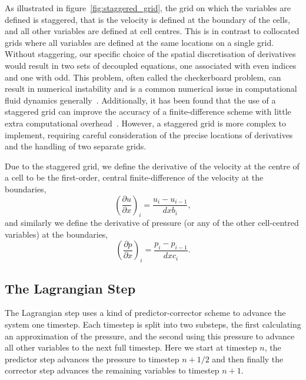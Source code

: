 As illustrated in figure~\ref{fig:staggered_grid}, the grid on which the variables are defined is staggered, that is the velocity is defined at the boundary of the cells, and all other variables are defined at cell centres. This is in contrast to collocated grids where all variables are defined at the same locations on a single grid. Without staggering, our specific choice of the spatial discretisation of derivatives would result in two sets of decoupled equations, one associated with even indices and one with odd. This problem, often called the checkerboard problem, can result in numerical instability and is a common numerical issue in computational fluid dynamics generally~\cite{ferzigerComputationalMethodsFluid2002}. Additionally, it has been found that the use of a staggered grid can improve the accuracy of a finite-difference scheme with little extra computational overhead~\cite{rojanaratanangkulePerformanceHighOrder2015}. However, a staggered grid is more complex to implement, requiring careful consideration of the precise locations of derivatives and the handling of two separate grids. 

Due to the staggered grid, we define the derivative of the velocity at the centre of a cell to be the first-order, central finite-difference of the velocity at the boundaries,
\begin{equation}
  {\left( \frac{\partial u}{\partial x} \right)}_i = \frac{u_i - u_{i-1}}{dxb_i},
  \label{}
\end{equation}
and similarly we define the derivative of pressure (or any of the other cell-centred variables) at the boundaries,
\begin{equation}
  {\left( \frac{\partial p}{\partial x} \right)}_i = \frac{p_i - p_{i-1}}{dxc_i}.
  \label{}
\end{equation}

\subsection{The Lagrangian Step}
The Lagrangian step uses a kind of predictor-corrector scheme to advance the system one timestep. Each timestep is split into two substeps, the first calculating an approximation of the pressure, and the second using this pressure to advance all other variables to the next full timestep. Here we start at timestep $n$, the predictor step advances the pressure to timestep $n+1/2$ and then finally the corrector step advances the remaining variables to timestep $n+1$.

